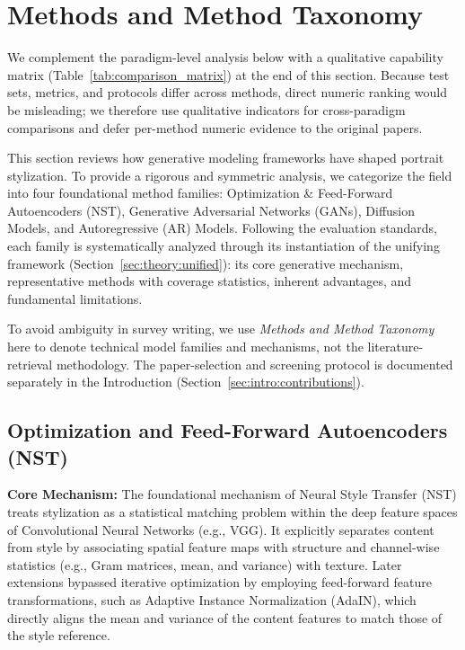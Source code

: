 \documentclass[journal]{IEEEtran}
\begin{document}
\section{Methods and Method Taxonomy}
\label{sec:methodology}

We complement the paradigm-level analysis below with a qualitative capability matrix (Table~\ref{tab:comparison_matrix}) at the end of this section. Because test sets, metrics, and protocols differ across methods, direct numeric ranking would be misleading; we therefore use qualitative indicators for cross-paradigm comparisons and defer per-method numeric evidence to the original papers.

This section reviews how generative modeling frameworks have shaped portrait stylization. To provide a rigorous and symmetric analysis, we categorize the field into four foundational method families: Optimization \& Feed-Forward Autoencoders (NST), Generative Adversarial Networks (GANs), Diffusion Models, and Autoregressive (AR) Models. Following the evaluation standards, each family is systematically analyzed through its instantiation of the unifying framework (Section~\ref{sec:theory:unified}): its core generative mechanism, representative methods with coverage statistics, inherent advantages, and fundamental limitations.

To avoid ambiguity in survey writing, we use \textit{Methods and Method Taxonomy} here to denote technical model families and mechanisms, not the literature-retrieval methodology. The paper-selection and screening protocol is documented separately in the Introduction (Section~\ref{sec:intro:contributions}).

\subsection{Optimization and Feed-Forward Autoencoders (NST)}
\label{sec:methodology:nst}

\textbf{Core Mechanism:} The foundational mechanism of Neural Style Transfer (NST) treats stylization as a statistical matching problem within the deep feature spaces of Convolutional Neural Networks (e.g., VGG). It explicitly separates content from style by associating spatial feature maps with structure and channel-wise statistics (e.g., Gram matrices, mean, and variance) with texture. Later extensions bypassed iterative optimization by employing feed-forward feature transformations, such as Adaptive Instance Normalization (AdaIN), which directly aligns the mean and variance of the content features to match those of the style reference.
\end{document}
